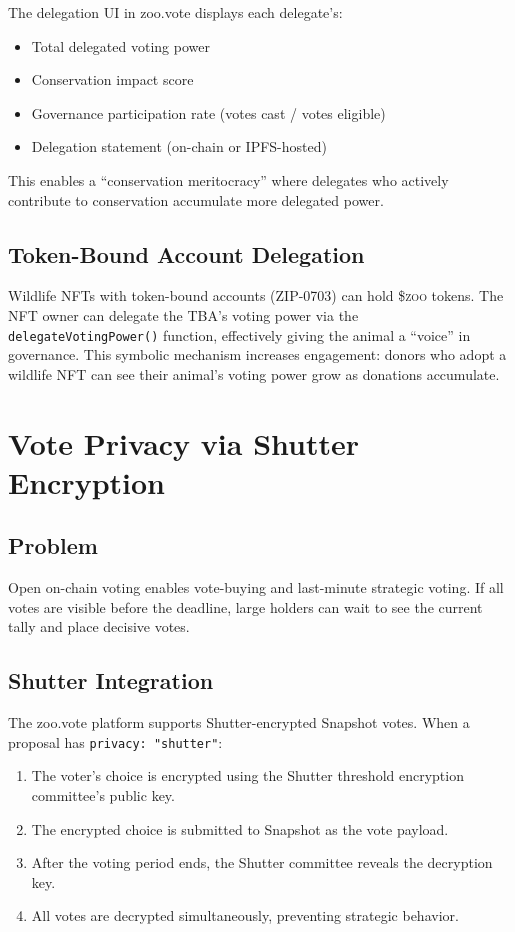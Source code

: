 \documentclass[11pt,letterpaper]{article}
\newcommand{\ZOO}{\$\textsc{zoo}}
\begin{document}
The delegation UI in zoo.vote displays each delegate's:

\begin{itemize}
    \item Total delegated voting power
    \item Conservation impact score
    \item Governance participation rate (votes cast / votes eligible)
    \item Delegation statement (on-chain or IPFS-hosted)
\end{itemize}

This enables a ``conservation meritocracy'' where delegates who actively contribute to conservation accumulate more delegated power.

\subsection{Token-Bound Account Delegation}

Wildlife NFTs with token-bound accounts (ZIP-0703) can hold \ZOO{} tokens. The NFT owner can delegate the TBA's voting power via the \texttt{delegateVotingPower()} function, effectively giving the animal a ``voice'' in governance. This symbolic mechanism increases engagement: donors who adopt a wildlife NFT can see their animal's voting power grow as donations accumulate.

\section{Vote Privacy via Shutter Encryption}
\label{sec:privacy}

\subsection{Problem}

Open on-chain voting enables vote-buying and last-minute strategic voting. If all votes are visible before the deadline, large holders can wait to see the current tally and place decisive votes.

\subsection{Shutter Integration}

The zoo.vote platform supports Shutter-encrypted Snapshot votes. When a proposal has \texttt{privacy: "shutter"}:

\begin{enumerate}
    \item The voter's choice is encrypted using the Shutter threshold encryption committee's public key.
    \item The encrypted choice is submitted to Snapshot as the vote payload.
    \item After the voting period ends, the Shutter committee reveals the decryption key.
    \item All votes are decrypted simultaneously, preventing strategic behavior.
\end{enumerate}
\end{document}
